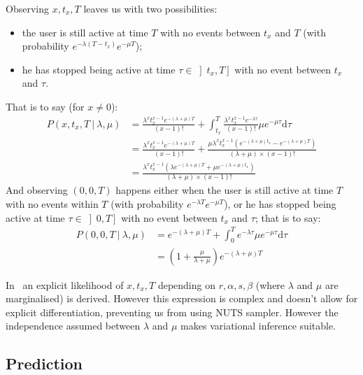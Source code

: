\documentclass{tufte-book}
\begin{document}
Observing $x,t_x, T$ leaves us with two possibilities:
\begin{itemize}
\item the user is still active at time $T$ with no events between
  $t_x$ and $T$ (with probability $e^{-\lambda (T-t_x)} e^{-\mu T}$);
\item he has stopped being active at time
  $\tau \in \left] t_x, T \right]$ with no event between $t_x$ and
  $\tau$.
\end{itemize}
That is to say (for $x\ne 0$):
\begin{align*}
  P(x,t_x,T \ |\ \lambda, \mu) & = \frac{\lambda^x t_x^{x-1}
    e^{-(\lambda + \mu) T}}{(x-1)!} + \int_{t_x}^T \frac{\lambda^x
    t_x^{x-1} e^{-\lambda\tau}}{(x-1)!} \mu e^{-\mu \tau}
  \mathrm{d}\tau \\ & = \frac{\lambda^x t_x^{x-1} e^{-(\lambda + \mu)
      T}}{(x-1)!}  + \frac{\mu\lambda^x t_x^{x-1} \left(
    e^{-(\lambda+\mu)t_x} -e^{-(\lambda+\mu)T}\right)}{(\lambda + \mu)
    \times(x-1)!}\\ & = \frac{\lambda^x t_x^{x-1} \left( \lambda
    e^{-(\lambda+\mu)T}+ \mu e^{-(\lambda+\mu)t_x} \right)}{(\lambda +
    \mu) \times(x-1)!}
\end{align*}
And observing $(0,0,T)$ happens either when the user is still active at
time $T$ with no events within $T$ (with probability
$e^{-\lambda T} e^{-\mu T}$), or he has stopped being active at
time $\tau \in \left ] 0, T \right]$ with no event between $t_x$ and
$\tau$; that is to say:
\begin{align*}
  P(0,0,T \ |\ \lambda, \mu)
  & =  e^{-(\lambda + \mu) T}  + \int_{0}^T  e^{-\lambda\tau}    \mu e^{-\mu \tau}
    \mathrm{d}\tau \\
  & =
    \left(1 + \frac{\mu}{\lambda + \mu}\right)
    e^{-(\lambda + \mu) T}
\end{align*}

In~\cite{Schmittlein1987} an explicit likelihood of $x,t_x,T$
depending on $r,\alpha, s, \beta$ (where $\lambda$ and $\mu$ are
marginalised) is derived. However this expression is
complex and doesn't allow for explicit differentiation, preventing us
from using NUTS sampler. However the independence assumed between
$\lambda$ and $\mu$ makes variational inference suitable.


\subsection{Prediction}
\label{sub:prediction_pareto_nbd}
\end{document}
